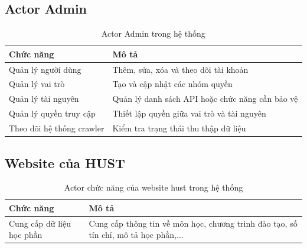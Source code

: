 \documentclass[../DoAn.tex]{subfiles}
\begin{document}
\subsection{Actor Admin}
\begin{table}[htbp]
    \centering
    \small
    \renewcommand{\arraystretch}{1.6}
    \label{tab:admin_functions}
    \begin{tabular}{|>{\centering\arraybackslash}m{4cm}|>{\arraybackslash}m{8cm}|}
        \hline
        \textbf{Chức năng}        & \textbf{Mô tả}                                  \\
        \hline
        Quản lý người dùng        & Thêm, sửa, xóa và theo dõi tài khoản            \\
        \hline
        Quản lý vai trò           & Tạo và cập nhật các nhóm quyền                  \\
        \hline
        Quản lý tài nguyên        & Quản lý danh sách API hoặc chức năng cần bảo vệ \\
        \hline
        Quản lý quyền truy cập    & Thiết lập quyền giữa vai trò và tài nguyên      \\
        \hline
        Theo dõi hệ thống crawler & Kiểm tra trạng thái thu thập dữ liệu            \\
        \hline
    \end{tabular}
    \caption{Actor Admin trong hệ thống}
\end{table}

\newpage
\subsection{Website của HUST}
\begin{table}[htbp]
    \centering
    \renewcommand{\arraystretch}{1.8}
    \label{tab:website_functions}
    \begin{tabular}{|>{\centering\arraybackslash}m{5cm}|>{\arraybackslash}m{9cm}|}
        \hline
        \textbf{Chức năng}        & \textbf{Mô tả}                                                                      \\
        \hline
        Cung cấp dữ liệu học phần & Cung cấp thông tin về môn học, chương trình đào tạo, số tín chỉ, mô tả học phần,... \\
        \hline
    \end{tabular}
    \caption{Actor chức năng của website hust trong hệ thống}
\end{table}
\end{document}
